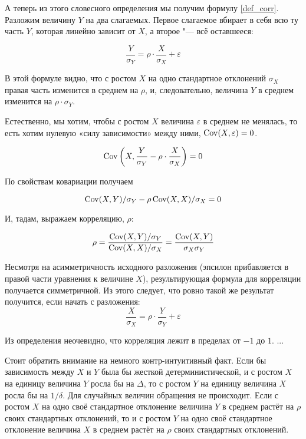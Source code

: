 \documentclass[10pt]{article}
\begin{document}
А теперь из этого словесного определения мы получим формулу \ref{def_corr}. Разложим величину $Y$ на два слагаемых. Первое слагаемое вбирает в себя всю ту часть $Y$, которая линейно зависит от $X$, а второе "--- всё оставшееся:

\[
\frac{Y}{\sigma_Y}=\rho \cdot \frac{X}{\sigma_X} + \varepsilon
\]

В этой формуле видно, что с ростом $X$ на одно стандартное отклонений $\sigma_X$ правая часть изменится в среднем на $\rho$, и, следовательно, величина $Y$ в среднем изменится на $\rho \cdot \sigma_Y$. 

%

Естественно, мы хотим, чтобы с ростом $X$ величина $\varepsilon$ в среднем не менялась, то есть хотим нулевую «силу зависимости» между ними, $\operatorname{Cov}(X,\varepsilon)=0$. 


\[
\operatorname{Cov}\left(X, \frac{Y}{\sigma_Y} - \rho \cdot \frac{X}{\sigma_X} \right) = 0
\]

По свойствам ковариации получаем

\[
\operatorname{Cov}(X,Y)/\sigma_Y- \rho \operatorname{Cov}(X,X)/\sigma_X=0
\]

И, тадам, выражаем корреляцию, $\rho$:

\[
\rho = \frac{\operatorname{Cov}(X,Y)/\sigma_Y}{\operatorname{Cov}(X,X)/\sigma_X} = \frac{\operatorname{Cov}(X,Y)}{\sigma_X \sigma_Y}
\]

Несмотря на асимметричность исходного разложения (эпсилон прибавляется в правой части уравнения к величине $X$), результирующая формула для корреляции получается симметричной. Из этого следует, что ровно такой же результат получится, если начать с разложения:
\[
\frac{X}{\sigma_X}=\rho \cdot \frac{Y}{\sigma_Y} + \varepsilon
\]

Из определения неочевидно, что корреляция лежит в пределах от $-1$ до $1$. ...


Стоит обратить внимание на немного контр-интуитивный факт. Если бы зависимость между $X$ и $Y$ была бы жесткой детерминистической, и с ростом $X$ на единицу величина $Y$ росла бы на $\Delta$, то с ростом $Y$ на единицу величина $X$ росла бы на $1/\delta$. Для случайных величин обращения не происходит. Если с ростом $X$ на одно своё стандартное отклонение величина $Y$ в среднем растёт на $\rho$ своих стандартных отклонений, то и с ростом $Y$ на одно своё стандартное отклонение величина $X$ в среднем растёт на $\rho$ своих стандартных отклонений.
\end{document}
